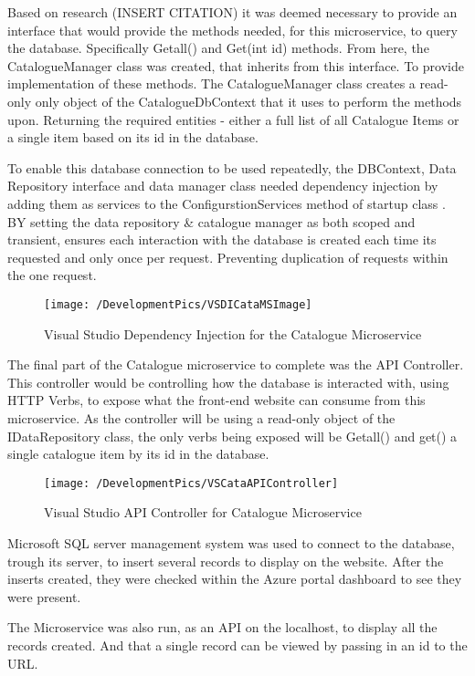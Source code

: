 Based on research (INSERT CITATION) it was deemed necessary to provide an interface that would provide the methods needed, for this microservice, to query the database. Specifically Getall() and Get(int id) methods. From here, the CatalogueManager class was created, that inherits from this interface. To provide implementation of these methods. The CatalogueManager class creates a read-only only object of the CatalogueDbContext that it uses to perform the methods upon. Returning the required entities - either a full list of all Catalogue Items or a single item based on its id in the database. 

To enable this database connection to be used repeatedly, the DBContext, Data Repository interface and data manager class needed dependency injection by adding them as services to the ConfigurstionServices method of startup class \cite{DependInjectMicrosoft}. BY setting the data repository \& catalogue manager as both scoped and transient, ensures each interaction with the database is created each time its requested and only once per request. Preventing duplication of requests within the one request.
\begin{figure}[h]
	\caption{Visual Studio Dependency Injection for the Catalogue Microservice}
	\label{fig:VSDICataMs}
	\texttt{[image: /DevelopmentPics/VSDICataMSImage]}
\end{figure}

The final part of the Catalogue microservice to complete was the API Controller. This controller would be controlling how the database is interacted with, using HTTP Verbs, to expose what the front-end website can consume from this microservice. As the controller will be using a read-only object of the IDataRepository class, the only verbs being exposed will be Getall() and get() a single catalogue item by its id in the database.
\begin{figure}[h]
	\caption{Visual Studio API Controller for Catalogue Microservice}
	\label{fig:VSAPiCataMs}
	\texttt{[image: /DevelopmentPics/VSCataAPIController]}
\end{figure}
Microsoft SQL server management system was used to connect to the database, trough its server, to insert several records to display on the website. After the inserts created, they were checked within the Azure portal dashboard to see they were present.

The Microservice was also run, as an API on the localhost, to display all the records created. And that a single record can be viewed by passing in an id to the URL.


